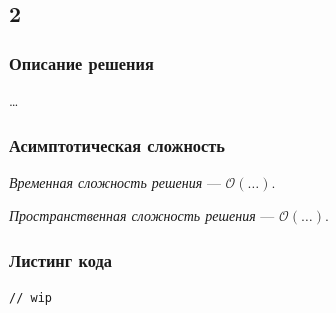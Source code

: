 \subsection{2}

\subsubsection{Описание решения}

\dots

\subsubsection{Асимптотическая сложность}

\textit{Временная сложность решения} --- \( \mathcal{O}(\dots) \).

\textit{Пространственная сложность решения} --- \( \mathcal{O}(\dots) \).

\subsubsection{Листинг кода}

\begin{lstlisting}
// wip
\end{lstlisting}